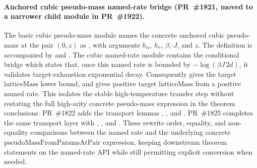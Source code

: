 \documentclass[a4paper,11pt]{article}
\begin{document}
\paragraph{Anchored cubic pseudo-mass named-rate bridge
(PR~\#1821, moved to a narrower child module in PR~\#1922).}
The basic cubic pseudo-mass module
names the concrete anchored cubic pseudo-mass at the pair \((0,z)\) as
, with arguments
\(h_\alpha\), \(h_r\), \(\beta\), \(J\), and \(z\).
The definition is accompanied by
 and
.  The cubic named-rate
module
contains the conditional bridge
which states that, once this named rate is bounded by
\(-\log(\beta J\,2d)\), it validates target-exhaustion exponential decay.
Consequently
gives the target \(\mathrm{latticeMass}\) lower bound, and
gives positive target \(\mathrm{latticeMass}\) from a positive named rate.
This isolates the stable high-temperature transfer step without restating the
full high-arity concrete pseudo-mass expression in the theorem conclusions.
PR~\#1822 adds the transport lemmas
,
, and
.  PR~\#1825 completes
the same transport layer with
,
, and
.  These rewrite
order, equality, and non-equality comparisons between the named rate and the
underlying concrete
\(\mathrm{pseudoMassFromParamsAtPair}\) expression, keeping downstream theorem
statements on the named-rate API while still permitting explicit conversion
when needed.
\end{document}
